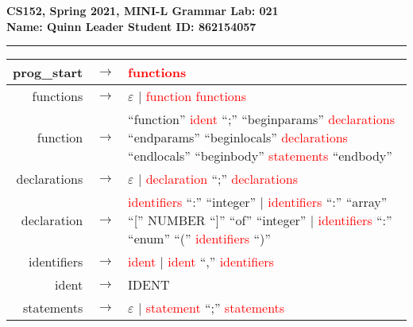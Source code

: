 \documentclass{article}[12pt]
\newcommand{\prodrule}[1]{#1}
\newcommand{\nonterm}[1]{\textcolor{red}{#1}}
\newcommand{\term}[1]{#1}
\begin{document}
{
\noindent \large \bf
CS152, Spring 2021,
MINI-L Grammar
\hfill
Lab: 021\\
Name: Quinn Leader \hfill
Student ID: 862154057 \\
\noindent\rule{\textwidth}{1pt}
}

\begin{tabular}{r c p{10cm}}
	\prodrule{prog\_start} & $\rightarrow$ &
		      \nonterm{functions} \\
	\hline

	\prodrule{functions} & $\rightarrow$ &
		        $\varepsilon$
		$\vert$ \nonterm{function} \nonterm{functions} \\
	\hline

	\prodrule{function} & $\rightarrow$ &
		        \term{``function''} \nonterm{ident} \term{``;''} \term{``beginparams''} \nonterm{declarations} \term{``endparams''}
		        \term{``beginlocals''} \nonterm{declarations} \term{``endlocals''} \term{``beginbody''} \nonterm{statements} \term{``endbody''} \\
	\hline

	\prodrule{declarations} & $\rightarrow$ &
		        $\varepsilon$
		$\vert$ \nonterm{declaration} \term{``;''} \nonterm{declarations} \\
	\hline

	\prodrule{declaration} & $\rightarrow$ &
		        \nonterm{identifiers} \term{``:''} \term{``integer''} \newline
        $\vert$ \nonterm{identifiers} \term{``:''} \term{``array''} \term{``[''} \term{NUMBER} \term{``]''}
		        \term{``of''} \term{``integer''} \newline
		$\vert$ \nonterm{identifiers} \term{``:''} \term{``enum''} \term{``(''} \nonterm{identifiers} \term{``)''} \\
	\hline

	\prodrule{identifiers} & $\rightarrow$ &
		        \nonterm{ident} \newline
		$\vert$ \nonterm{ident} \term{``,''} \nonterm{identifiers} \\
	\hline

	\prodrule{ident} & $\rightarrow$ &
		        \term{IDENT} \\
	\hline

	\prodrule{statements} & $\rightarrow$ &
		        $\varepsilon$
		$\vert$ \nonterm{statement} \term{``;''} \nonterm{statements} \\
	\hline


\end{tabular}
\end{document}
